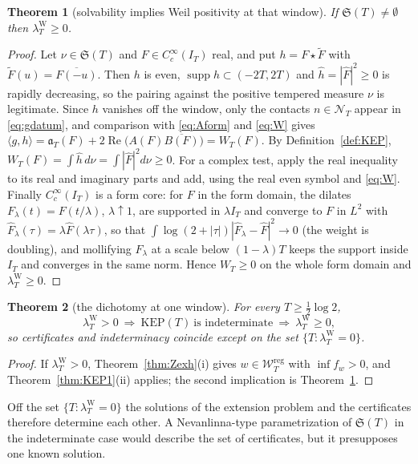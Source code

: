 \documentclass[11pt]{amsart}
\newtheorem{theorem}{Theorem}[section]
\theoremstyle{definition}
\theoremstyle{remark}
\newcommand{\Rel}{\operatorname{Re}}
\newcommand{\supp}{\operatorname{supp}}
\newcommand{\IT}{I_T}
\newcommand{\lamW}{\lambda^{\mathrm W}_T}
\newcommand{\Fh}{\widehat F}
\newcommand{\Wcl}{\mathcal W_T}
\newcommand{\NT}{\mathcal N_T}
\begin{document}
\begin{theorem}[solvability implies Weil positivity at that window]\label{thm:KEP2}
If $\mathfrak S(T)\ne\emptyset$ then $\lamW\ge0$.
\end{theorem}
\begin{proof}
Let $\nu\in\mathfrak S(T)$ and $F\in C_c^\infty(\IT)$ real, and put $h=F\star\widetilde F$ with
$\widetilde F(u)=\overline{F(-u)}$. Then $h$ is even, $\supp h\subset(-2T,2T)$ and
$\widehat h=|\Fh|^2\ge0$ is rapidly decreasing, so the pairing against the positive tempered measure
$\nu$ is legitimate. Since $h$ vanishes off the window, only the contacts $n\in\NT$ appear in
\eqref{eq:gdatum}, and comparison with \eqref{eq:Aform} and \eqref{eq:W} gives
$\langle g,h\rangle=\mathfrak a_T(F)+2\Rel\big(A(F)\overline{B(F)}\big)=W_T(F)$. By
Definition~\ref{def:KEP}, $W_T(F)=\int\widehat h\,d\nu=\int|\Fh|^2d\nu\ge0$. For a complex test, apply the real inequality to its real and imaginary parts and add, using the real even symbol and \eqref{eq:W}. Finally
$C_c^\infty(\IT)$ is a form core: for $F$ in the form domain, the dilates $F_\lambda(t)=F(t/\lambda)$,
$\lambda\uparrow1$, are supported in $\lambda\IT$ and converge to $F$ in $L^2$ with
$\Fh_\lambda(\tau)=\lambda\Fh(\lambda\tau)$, so that
$\int\log(2+|\tau|)|\Fh_\lambda-\Fh|^2\to0$ (the weight is doubling), and mollifying $F_\lambda$ at a
scale below $(1-\lambda)T$ keeps the support inside $\IT$ and converges in the same norm. Hence
$W_T\ge0$ on the whole form domain and $\lamW\ge0$.
\end{proof}

\begin{theorem}[the dichotomy at one window]\label{thm:KEPdich}
For every $T\ge\frac12\log2$,
\[
\lamW>0\ \Longrightarrow\ \mathrm{KEP}(T)\ \text{is indeterminate}\ \Longrightarrow\ \lamW\ge0 ,
\]
so certificates and indeterminacy coincide except on the set $\{T:\lamW=0\}$.
\end{theorem}
\begin{proof}
If $\lamW>0$, Theorem~\ref{thm:Zexh}(i) gives $w\in\Wcl^{\mathrm{reg}}$ with $\inf f_w>0$, and
Theorem~\ref{thm:KEP1}(ii) applies; the second implication is Theorem~\ref{thm:KEP2}.
\end{proof}

Off the set $\{T:\lamW=0\}$ the solutions of the extension problem and the certificates therefore
determine each other. A Nevanlinna-type parametrization of $\mathfrak S(T)$ in the indeterminate case
would describe the set of certificates, but it presupposes one known solution.
\end{document}
